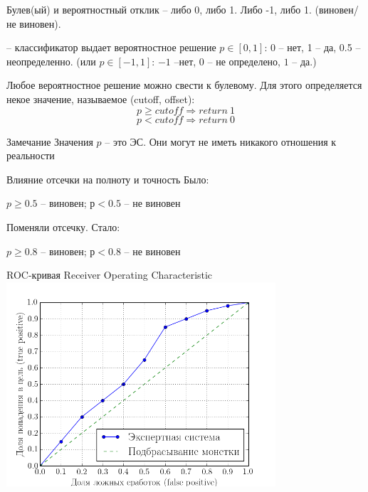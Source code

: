   \begin{frame}{Булев(ый) и вероятностный отклик}
  \small
   -- либо 0, либо 1. Либо -1, либо 1. (виновен/не виновен).
  
   -- классификатор выдает вероятностное 
   решение $p \in [0, 1]$:
  0 -- нет, 1 -- да, 0.5 -- неопределенно.
  (или $p \in [-1, 1]$: $-1$ --нет, $0$ -- не определено, $1$ -- да.)
  
  Любое вероятностное решение можно свести к булевому.
  Для этого определяется некое значение, называемое
   (cutoff, offset):
  \begin{equation}
  p \geqslant cutoff \Longrightarrow return ~ 1
  \end{equation}
  \begin{equation*}
  p < cutoff \Longrightarrow return ~ 0
  \end{equation*}
  
  \begin{block}{Замечание}
  Значения $p$ -- это  ЭС.
  Они могут не иметь никакого отношения к реальности
  \end{block}
  \end{frame}

  \begin{frame}{Влияние отсечки на полноту и точность}
  Было: 
  \begin{center}
   $p \geqslant 0.5$ – виновен; $р<0.5$ – не виновен
\end{center}
  Поменяли отсечку. Стало:
  \begin{center}
     $p \geqslant 0.8$ – виновен; $р<0.8$ – не виновен
  \end{center}
   
  \end{frame}

  \begin{frame}{ROC-кривая}\label{frame:roc}
  \centering
   Receiver Operating Characteristic
   \includegraphics[width=10cm]{../pic/roc_example.png}
   \end{frame}

